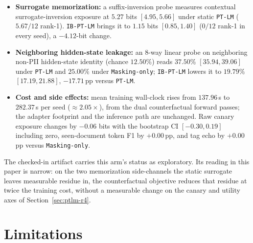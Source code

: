 \documentclass{article}
\begin{document}
\begin{itemize}
    \item \textbf{Surrogate memorization:} a suffix-inversion probe measures contextual surrogate-inversion exposure at $5.27$ bits $[4.95, 5.66]$ under static \texttt{PT-LM} ($5.67/12$ rank-1). \texttt{IB-PT-LM} brings it to $\mathbf{1.15}$ bits $[0.85, 1.40]$ ($0/12$ rank-1 in every seed), a $-4.12$-bit change.
    \item \textbf{Neighboring hidden-state leakage:} an $8$-way linear probe on neighboring non-PII hidden-state identity (chance $12.50\%$) reads $37.50\%$ $[35.94, 39.06]$ under \texttt{PT-LM} and $25.00\%$ under \texttt{Masking-only}; \texttt{IB-PT-LM} lowers it to $\mathbf{19.79\%}$ $[17.19, 21.88]$, $-17.71$\,pp versus \texttt{PT-LM}.
    \item \textbf{Cost and side effects:} mean training wall-clock rises from $137.96$\,s to $282.37$\,s per seed ($\approx 2.05\times$), from the dual counterfactual forward passes; the adapter footprint and the inference path are unchanged. Raw canary exposure changes by $-0.06$ bits with the bootstrap CI $[-0.30, 0.19]$ including zero, seen-document token F1 by $+0.00$\,pp, and tag echo by $+0.00$\,pp versus \texttt{Masking-only}.
\end{itemize}

The checked-in artifact carries this arm's status as exploratory. Its reading in this paper is narrow: on the two memorization side-channels the static surrogate leaves measurable residue in, the counterfactual objective reduces that residue at twice the training cost, without a measurable change on the canary and utility axes of Section~\ref{sec:ptlm-r4}.

\section{Limitations}
\label{sec:limitations}
\end{document}
